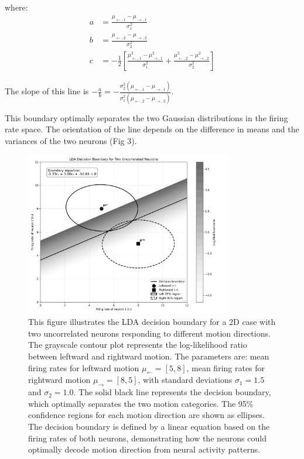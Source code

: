 \documentclass{article}
\begin{document}
where:
\begin{align}
a &= \frac{\mu_{\leftarrow,1} - \mu_{\rightarrow,1}}{\sigma_1^2} \\
b &= \frac{\mu_{\leftarrow,2} - \mu_{\rightarrow,2}}{\sigma_2^2} \\
c &= -\frac{1}{2}\left[ \frac{\mu_{\leftarrow,1}^2 - \mu_{\rightarrow,1}^2}{\sigma_1^2} + \frac{\mu_{\leftarrow,2}^2 - \mu_{\rightarrow,2}^2}{\sigma_2^2} \right]
\end{align}

The slope of this line is $-\frac{a}{b} = -\frac{\sigma_2^2(\mu_{\leftarrow,1} - \mu_{\rightarrow,1})}{\sigma_1^2(\mu_{\leftarrow,2} - \mu_{\rightarrow,2})}$.

This boundary optimally separates the two Gaussian distributions in the firing rate space. The orientation of the line depends on the difference in means and the variances of the two neurons (Fig 3).

\begin{figure}[h]
    \centering
    \includegraphics[width=0.8\textwidth]{lda_decision_boundary.png}
    \caption{This figure illustrates the LDA decision boundary for a 2D case with two uncorrelated neurons responding to different motion directions. The grayscale contour plot represents the log-likelihood ratio between leftward and rightward motion. The parameters are: mean firing rates for leftward motion $\mu_{\leftarrow} = [5, 8]$, mean firing rates for rightward motion $\mu_{\rightarrow} = [8, 5]$, with standard deviations $\sigma_1 = 1.5$ and $\sigma_2 = 1.0$. The solid black line represents the decision boundary, which optimally separates the two motion categories. The 95\% confidence regions for each motion direction are shown as ellipses. The decision boundary is defined by a linear equation based on the firing rates of both neurons, demonstrating how the neurons could optimally decode motion direction from neural activity patterns.}
    \label{fig:lda_boundary}
\end{figure}
\end{document}
